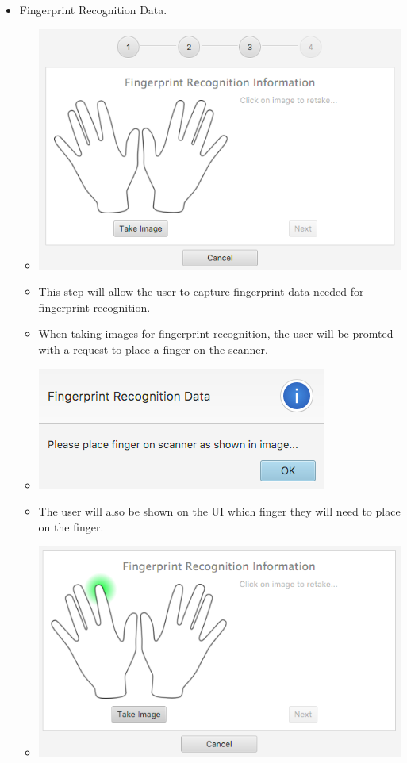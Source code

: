\begin{itemize}
\begin{itemize}
				\item Fingerprint Recognition Data.
				\begin{itemize}
					\item \includegraphics[width=\linewidth]{images/Screenshots/Registration/Reg_Step3.png}
					\item This step will allow the user to capture fingerprint data needed for fingerprint recognition.
					\item When taking images for fingerprint recognition, the user will be promted with a request to place a finger on the scanner.
					\item \includegraphics[width=\linewidth]{images/Screenshots/Registration/Reg_Step3_Finger.png}
					\item The user will also be shown on the UI which finger they will need to place on the finger.
					\item \includegraphics[width=\linewidth]{images/Screenshots/Registration/Reg_Step3_finger1.png}
				\end{itemize}
				

\end{itemize}
\end{itemize}

